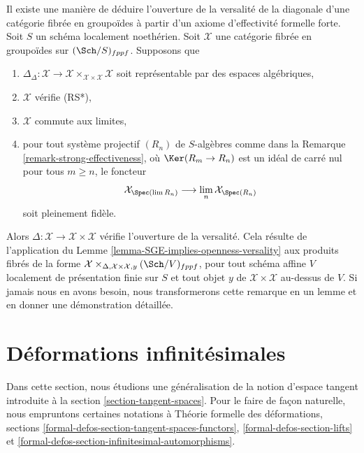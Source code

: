 \begin{remark}
\label{remark-trade-openness-versality-diagonal-with-strong-effectiveness}
Il existe une manière de déduire l'ouverture de la versalité de la diagonale
d'une catégorie fibrée en groupoïdes à partir d'un axiome d'effectivité formelle
forte.
Soit $S$ un schéma localement noethérien. Soit $\mathcal{X}$ une catégorie fibrée
en groupoïdes sur $(\Sch/S)_{fppf}$. Supposons que
\begin{enumerate}
\item $\Delta_\Delta : \mathcal{X} \to
\mathcal{X} \times_{\mathcal{X} \times \mathcal{X}} \mathcal{X}$
soit représentable par des espaces algébriques,
\item $\mathcal{X}$ vérifie (RS*),
\item $\mathcal{X}$ commute aux limites,
\item pour tout système projectif $(R_n)$ de $S$-algèbres
comme dans la Remarque \ref{remark-strong-effectiveness},
où $\Ker(R_m \to R_n)$ est un idéal de carré nul pour tous $m \geq n$,
le foncteur
$$
\mathcal{X}_{\Spec(\lim R_n)} \longrightarrow
\lim_n \mathcal{X}_{\Spec(R_n)}
$$
soit pleinement fidèle.
\end{enumerate}
Alors $\Delta : \mathcal{X} \to \mathcal{X} \times \mathcal{X}$
vérifie l'ouverture de la versalité. Cela résulte de l'application du
Lemme \ref{lemma-SGE-implies-openness-versality}
aux produits fibrés de la forme
$\mathcal{X} \times_{\Delta, \mathcal{X} \times \mathcal{X}, y}
(\Sch/V)_{fppf}$, pour tout schéma affine $V$ localement
de présentation finie sur $S$ et tout objet $y$ de
$\mathcal{X} \times \mathcal{X}$ au-dessus de $V$.
Si jamais nous en avons besoin, nous transformerons cette remarque en
un lemme et en donner une démonstration détaillée.
\end{remark}











\section{Déformations infinitésimales}
\label{section-inf}

\noindent
Dans cette section, nous étudions une généralisation de la notion
d'espace tangent introduite à la section \ref{section-tangent-spaces}.
Pour le faire de façon naturelle, nous empruntons certaines notations à
Théorie formelle des déformations, sections
\ref{formal-defos-section-tangent-spaces-functors},
\ref{formal-defos-section-lifts} et
\ref{formal-defos-section-infinitesimal-automorphisms}.

